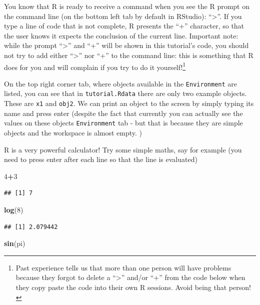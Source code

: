\documentclass[]{book}
\newenvironment{Shaded}{\begin{snugshade}}{\end{snugshade}}
\newcommand{\KeywordTok}[1]{\textcolor[rgb]{0.13,0.29,0.53}{\textbf{#1}}}
\newcommand{\DecValTok}[1]{\textcolor[rgb]{0.00,0.00,0.81}{#1}}
\newcommand{\OperatorTok}[1]{\textcolor[rgb]{0.81,0.36,0.00}{\textbf{#1}}}
\newcommand{\NormalTok}[1]{#1}
\let\rmarkdownfootnote\footnote%
\def\footnote{\protect\rmarkdownfootnote}
\theoremstyle{definition}
\theoremstyle{definition}
\theoremstyle{remark}
\begin{document}
You know that R is ready to receive a command when you see the R prompt
on the command line (on the bottom left tab by default in RStudio):
``\textgreater{}''. If you type a line of code that is not complete, R
presents the ``+'' character, so that the user knows it expects the
conclusion of the current line. Important note: while the prompt
``\textgreater{}'' and ``+'' will be shown in this tutorial's code, you
should not try to add either ``\textgreater{}'' nor ``+'' to the command
line: this is something that R does for you and will complain if you try
to do it yourself!\footnote{Past experience tells us that more than one
  person will have problems because they forgot to delete a
  ``\textgreater{}'' and/or ``+'' from the code below when they copy
  paste the code into their own R sessions. Avoid being that person!}

On the top right corner tab, where objects available in the
\texttt{Environment} are listed, you can see that in
\texttt{tutorial.Rdata} there are only two example objects. These are
\texttt{x1} and \texttt{obj2}. We can print an object to the screen by
simply typing its name and press enter (despite the fact that currently
you can actually see the values on these objects \texttt{Environment}
tab - but that is because they are simple objects and the workspace is
almost empty. )

R is a very powerful calculator! Try some simple maths, say for example
(you need to press enter after each line so that the line is evaluated)

\begin{Shaded}
\begin{Highlighting}[]
\DecValTok{4}\OperatorTok{+}\DecValTok{3}
\end{Highlighting}
\end{Shaded}

\begin{verbatim}
## [1] 7
\end{verbatim}

\begin{Shaded}
\begin{Highlighting}[]
\KeywordTok{log}\NormalTok{(}\DecValTok{8}\NormalTok{)}
\end{Highlighting}
\end{Shaded}

\begin{verbatim}
## [1] 2.079442
\end{verbatim}

\begin{Shaded}
\begin{Highlighting}[]
\KeywordTok{sin}\NormalTok{(pi)}
\end{Highlighting}
\end{Shaded}
\end{document}
